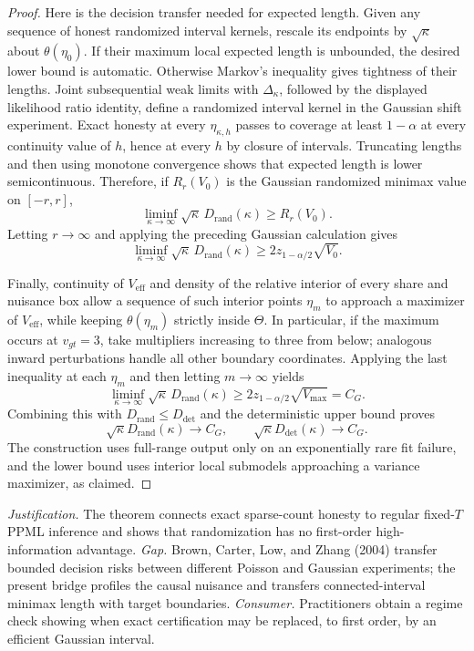 \documentclass{article}
\begin{document}
\begin{proof}
Here is the decision transfer needed for expected length.  Given any
sequence of honest randomized interval kernels, rescale its endpoints by
\(\sqrt\kappa\) about \(\theta(\eta_0)\).  If their maximum local expected
length is unbounded, the desired lower bound is automatic.  Otherwise
Markov's inequality gives tightness of their lengths.  Joint subsequential
weak limits with \(\Delta_\kappa\), followed by the displayed likelihood
ratio identity, define a randomized interval kernel in the Gaussian shift
experiment.  Exact honesty at every \(\eta_{\kappa,h}\) passes to coverage
at least \(1-\alpha\) at every continuity value of \(h\), hence at every
\(h\) by closure of intervals.  Truncating lengths and then using monotone
convergence shows that expected length is lower semicontinuous.  Therefore,
if \(R_r(V_0)\) is the Gaussian randomized minimax value on
\([-r,r]\),
\[
 \liminf_{\kappa\to\infty}
 \sqrt\kappa\,D_{\mathrm{rand}}(\kappa)\geq R_r(V_0).
\]
Letting \(r\to\infty\) and applying the preceding Gaussian calculation
gives
\[
 \liminf_{\kappa\to\infty}
 \sqrt\kappa\,D_{\mathrm{rand}}(\kappa)
 \geq2z_{1-\alpha/2}\sqrt{V_0}.
\]

Finally, continuity of \(V_{\mathrm{eff}}\) and density of the relative
interior of every share and nuisance box allow a sequence of such interior
points \(\eta_m\) to approach a maximizer of \(V_{\mathrm{eff}}\), while
keeping \(\theta(\eta_m)\) strictly inside \(\Theta\).  In particular,
if the maximum occurs at \(v_{gt}=3\), take multipliers increasing to
three from below; analogous inward perturbations handle all other boundary
coordinates.  Applying the last inequality at each \(\eta_m\) and then
letting \(m\to\infty\) yields
\[
 \liminf_{\kappa\to\infty}
 \sqrt\kappa\,D_{\mathrm{rand}}(\kappa)
 \geq2z_{1-\alpha/2}\sqrt{V_{\max}}=C_G.
\]
Combining this with
\(D_{\mathrm{rand}}\leq D_{\mathrm{det}}\) and the deterministic upper
bound proves
\[
 \sqrt\kappa D_{\mathrm{rand}}(\kappa)\longrightarrow C_G,
 \qquad
 \sqrt\kappa D_{\mathrm{det}}(\kappa)\longrightarrow C_G.
\]
The construction uses full-range output only on an exponentially rare fit
failure, and the lower bound uses interior local submodels approaching a
variance maximizer, as claimed.
\end{proof}
\par\smallskip\noindent \textit{Justification.} The theorem connects exact sparse-count honesty to regular fixed-\(T\) PPML inference and shows that randomization has no first-order high-information advantage. \textit{Gap.} Brown, Carter, Low, and Zhang (2004) transfer bounded decision risks between different Poisson and Gaussian experiments; the present bridge profiles the causal nuisance and transfers connected-interval minimax length with target boundaries. \textit{Consumer.} Practitioners obtain a regime check showing when exact certification may be replaced, to first order, by an efficient Gaussian interval.
\end{document}
